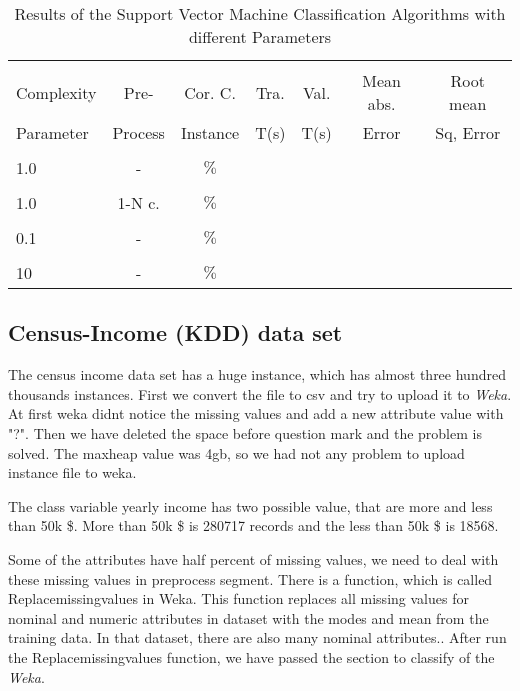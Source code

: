 \documentclass[a4paper]{article}
\begin{document}
\begin{table}
\begin{tabular}{|l| c | c | c | c |c |c |}

\hline & & & & & & \\
Complexity & Pre- &  Cor. C. & Tra. & Val. & Mean abs.  & Root mean \\
Parameter & Process & Instance & T(s) &  T(s) & Error & Sq, Error \\
\hline & & & & & & \\
1.0 & - &		   $\%$ &			& 		 & 		 &  \\ 
\hline & & & & & & \\
1.0  & 1-N c. &	   $\%$ &			& 		 & 		  &  \\ 
\hline & & & & & & \\
0.1	& - &			  $\%$ & 		& 		 & 		  &   \\ 
\hline & & & & & & \\
10	 & - &			   $\%$ &   		& 		 &  		 & \\ 
\hline
\end{tabular}
\caption{Results of the Support Vector Machine Classification Algorithms with different Parameters}
\end{table}


\subsection{Census-Income (KDD) data set}

The census income data set has a huge instance, which has almost three hundred thousands  instances. First we convert the file to csv and try to upload it to \emph{Weka}. At first weka didnt notice the missing values and add a new attribute value with "?". Then we have deleted the space before question mark and the problem is solved. The maxheap value was 4gb, so we had not any problem to upload instance file to weka. 

The class variable yearly income has two possible value, that are more and less than 50k \$. More than 50k \$ is 280717 records and the less than 50k \$ is 18568. 

Some of the attributes have half percent of missing values, we need to deal with these missing values in preprocess segment. There is a function, which is called Replacemissingvalues in Weka. This function replaces all missing values for nominal and numeric attributes in dataset with the modes and mean from the training data. In that dataset, there are also many nominal attributes.. After run the Replacemissingvalues function, we have passed the section to classify of the \emph{Weka}. 
\end{document}
